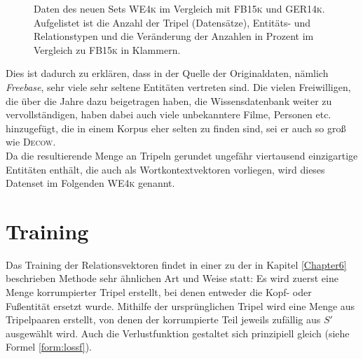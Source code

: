 \begin{figure}[h]
  \centering
  \begin{changemargin}{0cm}{0cm}
\end{changemargin}
  \caption[Daten des neuen Relationsdatensets im Vergleich zu \textsc{FB15k} und \textsc{GER14k}]{Daten des neuen Sets \textsc{WE4k} im Vergleich mit
  \textsc{FB15k} und \textsc{GER14k}. Aufgelistet ist die Anzahl der Tripel (Datensätze), Entitäts- und Relationstypen und die Veränderung
  der Anzahlen in Prozent im Vergleich zu \textsc{FB15k} in Klammern.\label{fig:we4k}}
\end{figure}

Dies ist dadurch zu erklären, dass in der Quelle der Originaldaten, nämlich \emph{Freebase},
sehr viele sehr seltene Entitäten vertreten sind. Die vielen Freiwilligen, die über die
Jahre dazu beigetragen haben, die Wissensdatenbank weiter zu vervollständigen, haben dabei auch
viele unbekanntere Filme, Personen etc. hinzugefügt, die in einem Korpus eher selten zu finden sind, sei er auch
so groß wie \textsc{Decow}.\\

Da die resultierende Menge an Tripeln gerundet ungefähr viertausend einzigartige Entitäten enthält, die auch als
Wortkontextvektoren vorliegen, wird dieses Datenset im Folgenden \textsc{WE4k} genannt.

\section{Training}

Das Training der Relationsvektoren findet in einer zu der in Kapitel \ref{Chapter6} beschrieben Methode sehr
ähnlichen Art und Weise statt: Es wird zuerst eine Menge korrumpierter Tripel erstellt, bei denen entweder
die Kopf- oder Fußentität ersetzt wurde.
Mithilfe der ursprünglichen Tripel wird eine Menge aus Tripelpaaren erstellt, von denen der korrumpierte Teil jeweils
zufällig aus $S'$ ausgewählt wird. Auch die Verlustfunktion gestaltet sich prinzipiell gleich (siehe Formel \ref{form:lossf}).\\

